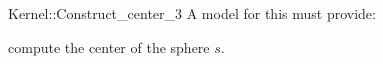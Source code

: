 \begin{ccRefFunctionObjectConcept}{Kernel::Construct_center_3}
A model for this must provide:


 {compute the center of the sphere $s$.}

\ccIsModel{}

\end{ccRefFunctionObjectConcept}
